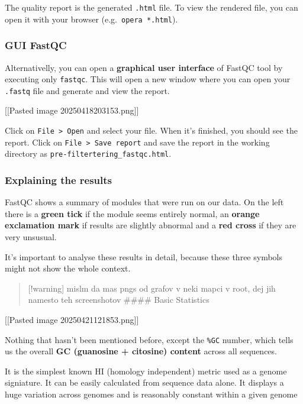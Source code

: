 The quality report is the generated \texttt{.html} file. To view the
rendered file, you can open it with your browser
(e.g.~\texttt{opera\ *.html}).

\hypertarget{gui-fastqc}{%
\subsubsection{GUI FastQC}\label{gui-fastqc}}

Alternativelly, you can open a \textbf{graphical user interface} of
FastQC tool by executing only \texttt{fastqc}. This will open a new
window where you can open your \texttt{.fastq} file and generate and
view the report.

{[}{[}Pasted image 20250418203153.png{]}{]}

Click on \texttt{File\ \textgreater{}\ Open} and select your file. When
it's finished, you should see the report. Click on
\texttt{File\ \textgreater{}\ Save\ report} and save the report in the
working directory as \texttt{pre-filtertering\_fastqc.html}.

\hypertarget{explaining-the-results}{%
\subsubsection{Explaining the results}\label{explaining-the-results}}

FastQC shows a summary of modules that were run on our data. On the left
there is a \textbf{green tick} if the module seems entirely normal, an
\textbf{orange exclamation mark} if results are slightly abnormal and a
\textbf{red cross} if they are very unsusual.

It's important to analyse these results in detail, because these three
symbols might not show the whole context.

\begin{quote}
{[}!warning{]} mislm da mas pngs od grafov v neki mapci v root, dej jih
namesto teh screenshotov \#\#\#\# Basic Statistics
\end{quote}

{[}{[}Pasted image 20250421121853.png{]}{]}

Nothing that hasn't been mentioned before, except the \texttt{\%GC}
number, which tells us the overall \textbf{GC (guanosine + citosine)
content} across all sequences.

It is the simplest known HI (homology independent) metric used as a
genome signiature. It can be easily calculated from sequence data alone.
It displays a huge variation across genomes and is reasonably constant
within a given genome

